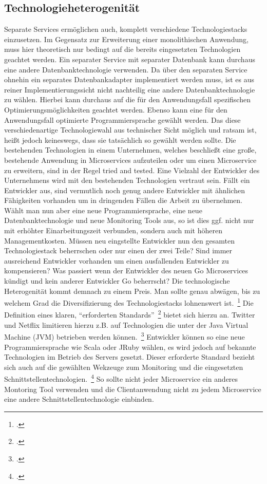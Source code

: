 \subsection{Technologieheterogenität}
Separate Services ermöglichen auch, komplett verschiedene Technologiestacks einzusetzen. Im Gegensatz zur Erweiterung einer monolithischen Anwendung, muss hier theoretisch nur bedingt auf die bereits eingesetzten Technologien geachtet werden. Ein separater Service mit separater Datenbank kann durchaus eine andere Datenbanktechnologie verwenden. Da über den separaten Service ohnehin ein separates Datenbankadapter implementiert werden muss, ist es aus reiner Implementierungssicht nicht nachteilig eine andere Datenbanktechnologie zu wählen. Hierbei kann durchaus auf die für den Anwendungsfall spezifischen Optimierungsmöglichkeiten geachtet werden. Ebenso kann eine für den Anwendungsfall optimierte Programmiersprache gewählt werden.
Das diese verschiedenartige Technologiewahl aus technischer Sicht möglich und ratsam ist, heißt jedoch keineswegs, dass sie tatsächlich so gewählt werden sollte. Die bestehenden Technologien in einem Unternehmen, welches beschließt eine große, bestehende Anwendung in Microservices aufzuteilen oder um einen Microservice zu erweitern, sind in der Regel tried and tested. Eine Vielzahl der Entwickler des Unternehmens wird mit den bestehenden Technologien vertraut sein. Fällt ein Entwickler aus, sind vermutlich noch genug andere Entwickler mit ähnlichen Fähigkeiten vorhanden um in dringenden Fällen die Arbeit zu übernehmen. Wählt man nun aber eine neue Programmiersprache, eine neue Datenbanktechnologie und neue Monitoring Tools aus, so ist dies ggf. nicht nur mit erhöhter Einarbeitungszeit verbunden, sondern auch mit höheren Managementkosten. Müssen neu eingstellte Entwickler nun den gesamten Technologiestack beherrschen oder nur einen der zwei Teile? Sind immer ausreichend Entwickler vorhanden um einen ausfallenden Entwickler zu kompensieren? Was passiert wenn der Entwickler des neuen Go Microservices kündigt und kein anderer Entwickler Go beherrscht? Die technologische Heterogenität kommt demnach zu einem Preis. Man sollte genau abwägen, bis zu welchem Grad die Diversifizierung des Technologiestacks lohnenswert ist.~\footcite[vgl.][Seiten 5, 6]{newman2015building}
Die Definition eines klaren, ``erforderten Standards''~\footcite[vgl.][Seiten 20, 21]{newman2015building} bietet sich hierzu an. Twitter und Netflix limitieren hierzu z.B. auf Technologien die unter der Java Virtual Machine (JVM) betrieben werden können.~\footcite[][Seite 6]{newman2015building} Entwickler können so eine neue Programmiersprache wie Scala oder JRuby wählen, es wird jedoch auf bekannte Technologien im Betrieb des Servers gesetzt. Dieser erforderte Standard bezieht sich auch auf die gewählten Wekzeuge zum Monitoring und die eingesetzten Schnittstellentechnologien.~\footcite[vgl.][Seite 21]{newman2015building} So sollte nicht jeder Microservice ein anderes Montoring Tool verwenden und die Clientanwendung nicht zu jedem Microservice eine andere Schnittstellentechnologie einbinden.

